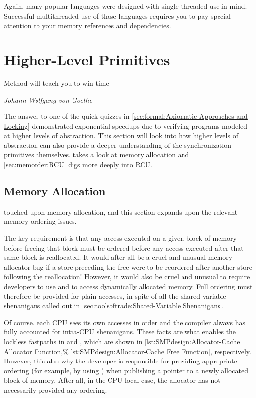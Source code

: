 Again, many popular languages were designed with single-threaded use
in mind.  Successful multithreaded use of these languages requires you
to pay special attention to your memory references and dependencies.

\section{Higher-Level Primitives}
\label{sec:memorder:Higher-Level Primitives}
%
\epigraph{Method will teach you to win time.}
	 {\emph{Johann Wolfgang von Goethe}}

The answer to one of the quick quizzes in
\cref{sec:formal:Axiomatic Approaches and Locking}
demonstrated exponential speedups due to verifying programs
modeled at higher levels of abstraction.
This section will look into how higher levels of abstraction can
also provide a deeper understanding of the synchronization primitives
themselves.
takes a look at memory allocation and
\cref{sec:memorder:RCU}
digs more deeply into RCU\@.

\subsection{Memory Allocation}
\label{sec:memorder:Memory Allocation}

touched upon memory allocation, and this section expands upon the relevant
memory-ordering issues.

The key requirement is that any access executed on a given block of
memory before freeing that block must be ordered before any access
executed after that same block is reallocated.
It would after all be a cruel and unusual memory-allocator bug if a store
preceding the free were to be reordered after another store following
the reallocation!
However, it would also be cruel and unusual to require developers to use
 and  to access dynamically allocated
memory.
Full ordering must therefore be provided for plain accesses, in spite of
all the shared-variable shenanigans called out in
\cref{sec:toolsoftrade:Shared-Variable Shenanigans}.

Of course, each CPU sees its own accesses in order and the compiler
always has fully accounted for intra-CPU shenanigans.
These facts are what enables the lockless fastpaths in
 and , which are shown in
\cref{lst:SMPdesign:Allocator-Cache Allocator Function,%
lst:SMPdesign:Allocator-Cache Free Function},
respectively.
However, this also why the developer is responsible for providing
appropriate ordering (for example, by using )
when publishing a pointer to a newly allocated block of memory.
After all, in the CPU-local case, the allocator has not necessarily
provided any ordering.

